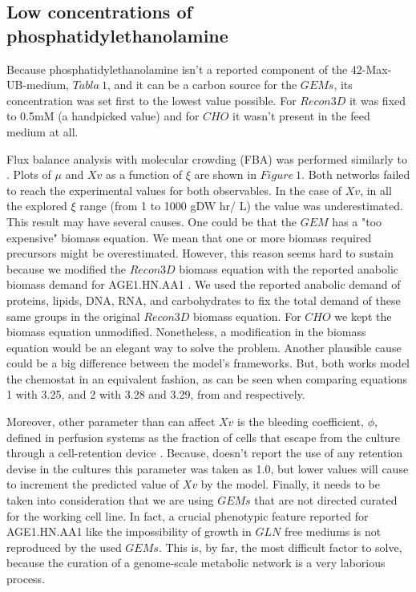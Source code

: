 \subsection{Low concentrations of phosphatidylethanolamine} 
	
	Because phosphatidylethanolamine isn't a reported component of the 42-Max-UB-medium, $Tabla\ 1$, and it can be a carbon source for the $GEMs$, its concentration was set first to the lowest value possible. For $Recon3D$ it was fixed to 0.5mM (a handpicked value) and for $CHO$ it wasn't present in the feed medium at all.
	
	
	
	Flux balance analysis with molecular crowding (FBA) was performed similarly to . Plots of $\mu$ and $Xv$ as a function of $\xi$ are shown in $Figure\ 1$. Both networks failed to reach the experimental values for both observables. In the case of $Xv$, in all the explored $\xi$ range (from 1 to 1000 gDW hr/ L) the value was underestimated. This result may have several causes. One could be that the $GEM$ has a "too expensive" biomass equation. We mean that one or more biomass required precursors might be overestimated. However, this reason seems hard to sustain because we modified the $Recon3D$ biomass equation with the reported anabolic biomass demand for AGE1.HN.AA1 . We used the reported anabolic demand of proteins, lipids, DNA, RNA, and carbohydrates to fix the total demand of these same groups in the original $Recon3D$ biomass equation. For $CHO$ we kept the biomass equation unmodified. Nonetheless, a modification in the biomass equation would be an elegant way to solve the problem. Another plausible cause could be a big difference between the model's frameworks. But, both works model the chemostat in an equivalent fashion, as can be seen when comparing equations 1 with 3.25, and 2 with 3.28 and 3.29, from  and  respectively.
	 
	
	
	Moreover, other parameter than can affect $Xv$ is the bleeding coefficient, $\phi$,
	defined in perfusion systems as the fraction of cells that escape from the culture through a cell-retention device . Because,  doesn't report the use of any retention devise in the cultures this parameter was taken as 1.0, but lower values will cause to increment the predicted value of  $Xv$ by the model. Finally, it needs to be taken into consideration that we are using $GEMs$ that are not directed curated for the working cell line. In fact, a crucial phenotypic feature reported for AGE1.HN.AA1 like the impossibility of growth in $GLN$ free mediums  is not reproduced by the used $GEMs$. This is, by far, the most difficult factor to solve, because the curation of a genome-scale metabolic network is a very laborious process.

